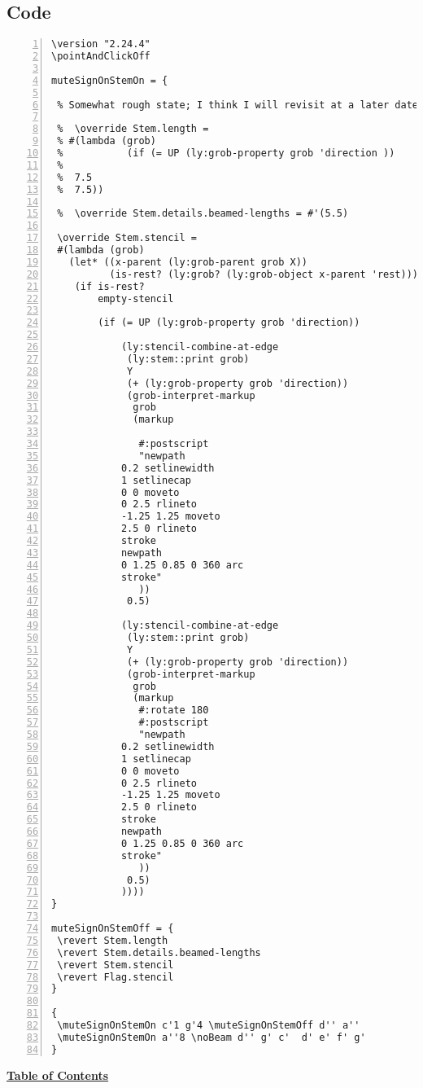 \subsection{Code}
\begin{Verbatim}[numbers=left,xleftmargin=5mm]
\version "2.24.4"
\pointAndClickOff

muteSignOnStemOn = {
 
 % Somewhat rough state; I think I will revisit at a later date.
 
 %  \override Stem.length =
 % #(lambda (grob)
 %           (if (= UP (ly:grob-property grob 'direction ))
 %
 %  7.5
 %  7.5))

 %  \override Stem.details.beamed-lengths = #'(5.5)

 \override Stem.stencil =
 #(lambda (grob)
   (let* ((x-parent (ly:grob-parent grob X))
          (is-rest? (ly:grob? (ly:grob-object x-parent 'rest))))
    (if is-rest?
        empty-stencil

        (if (= UP (ly:grob-property grob 'direction))

            (ly:stencil-combine-at-edge
             (ly:stem::print grob)
             Y
             (+ (ly:grob-property grob 'direction))
             (grob-interpret-markup
              grob
              (markup

               #:postscript
               "newpath
            0.2 setlinewidth
            1 setlinecap
            0 0 moveto
            0 2.5 rlineto
            -1.25 1.25 moveto
            2.5 0 rlineto
            stroke
            newpath
            0 1.25 0.85 0 360 arc
            stroke"
               ))
             0.5)

            (ly:stencil-combine-at-edge
             (ly:stem::print grob)
             Y
             (+ (ly:grob-property grob 'direction))
             (grob-interpret-markup
              grob
              (markup
               #:rotate 180
               #:postscript
               "newpath
            0.2 setlinewidth
            1 setlinecap
            0 0 moveto
            0 2.5 rlineto
            -1.25 1.25 moveto
            2.5 0 rlineto
            stroke
            newpath
            0 1.25 0.85 0 360 arc
            stroke"
               ))
             0.5)
            ))))
}

muteSignOnStemOff = {
 \revert Stem.length
 \revert Stem.details.beamed-lengths
 \revert Stem.stencil
 \revert Flag.stencil
}

{
 \muteSignOnStemOn c'1 g'4 \muteSignOnStemOff d'' a''
 \muteSignOnStemOn a''8 \noBeam d'' g' c'  d' e' f' g'
}
\end{Verbatim}
\hyperref[sec:toc]{\textbf{Table of Contents}}

